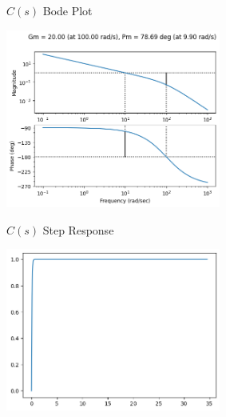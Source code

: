 \documentclass[11pt]{article}
\begin{document}
$C(s)$ Bode Plot

\includegraphics[width=200pt]{a4_8.png}
  
$C(s)$ Step Response

\includegraphics[width=200pt]{a4_9.png}
\end{document}
